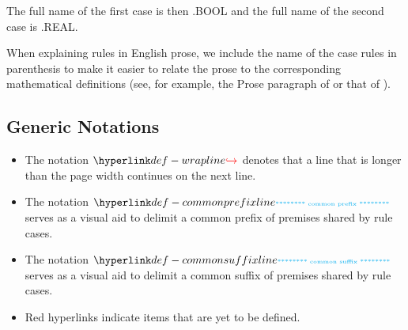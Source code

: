 The full name of the first case is then .BOOL
and the full name of the second case is .REAL.

When explaining rules in English prose, we include the name of the case rules
in parenthesis to make it easier to relate the prose to the corresponding mathematical
definitions (see, for example, the Prose paragraph of 
or that of ).

\subsection{Generic Notations}
\hypertarget{def-wrapline}{}
\begin{itemize}
\item
The notation $\wrappedline$ denotes that a line that is longer than the page width continues on the next line.

\hypertarget{def-commonprefixline}{}
\item The notation $\commonprefixline$ serves as a visual aid to delimit a common prefix of premises shared by rule cases.

\hypertarget{def-commonsuffixline}{}
\item The notation $\commonsuffixline$ serves as a visual aid to delimit a common suffix of premises shared by rule cases.

\hypertarget{tododefine}{}
\item {} Red hyperlinks indicate items that are yet to be defined.
\end{itemize}
